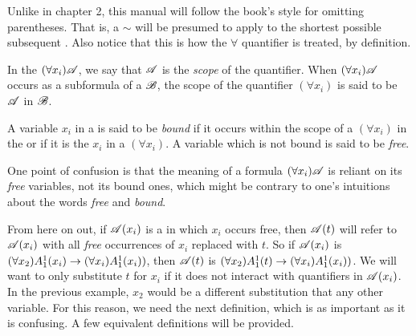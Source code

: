 \note{} Unlike in chapter 2, this manual will follow the book's style for omitting parentheses. That is, a \(\sim\) will be presumed to apply to the shortest possible subsequent \wf{}. Also notice that this is how the \(\forall\) quantifier is treated, by definition.

\setcounter{definition}{7}
\begin{definition}
  In the \wf{} \((\forall x_i)\mathscr{A}\), we say that \(\mathscr{A}\) is the \textit{scope} of the quantifier. When \((\forall x_i)\mathscr{A}\) occurs as a subformula of a \wf{} \(\mathscr{B}\), the scope of the quantifier \((\forall x_i)\) is said to be \(\mathscr{A}\) in \(\mathscr{B}\).

  A variable \(x_i\) in a \wf{} is said to be \textit{bound} if it occurs within the scope of a \((\forall x_i)\) in the \wf{} or if it is the \(x_i\) in a \((\forall x_i)\). A variable which is not bound is said to be \textit{free}.

  \note{} One point of confusion is that the meaning of a formula \((\forall x_i) \mathscr{A}\) is reliant on its \textit{free} variables, not its bound ones, which might be contrary to one's intuitions about the words \textit{free} and \textit{bound}.
\end{definition}

From here on out, if \(\mathscr{A}(x_i)\) is a \wf{} in which \(x_i\) occurs free, then \(\mathscr{A}(t)\) will refer to \(\mathscr{A}(x_i)\) with all \textit{free} occurrences of \(x_i\) replaced with \(t\). So if \(\mathscr{A}(x_i)\) is \((\forall x_2) A^1_1(x_i) \rightarrow (\forall x_i) A^1_1(x_i))\), then \(\mathscr{A}(t)\) is \((\forall x_2) A^1_1(t) \rightarrow (\forall x_i) A^1_1(x_i))\). We will want to only substitute \(t\) for \(x_i\) if it does not interact with quantifiers in \(\mathscr{A}(x_i)\). In the previous example, \(x_2\) would be a different substitution that any other variable. For this reason, we need the next definition, which is as important as it is confusing. A few equivalent definitions will be provided.

